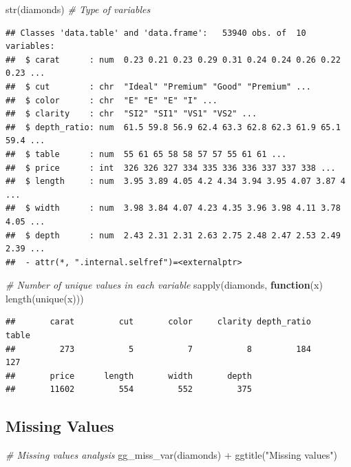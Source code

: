 \documentclass[
]{article}
\newenvironment{Shaded}{\begin{snugshade}}{\end{snugshade}}
\newcommand{\CommentTok}[1]{\textcolor[rgb]{0.56,0.35,0.01}{\textit{#1}}}
\newcommand{\ControlFlowTok}[1]{\textcolor[rgb]{0.13,0.29,0.53}{\textbf{#1}}}
\newcommand{\FunctionTok}[1]{\textcolor[rgb]{0.00,0.00,0.00}{#1}}
\newcommand{\NormalTok}[1]{#1}
\newcommand{\SpecialCharTok}[1]{\textcolor[rgb]{0.00,0.00,0.00}{#1}}
\newcommand{\StringTok}[1]{\textcolor[rgb]{0.31,0.60,0.02}{#1}}
\begin{document}
\begin{Shaded}
\begin{Highlighting}[]
\FunctionTok{str}\NormalTok{(diamonds) }\CommentTok{\# Type of variables}
\end{Highlighting}
\end{Shaded}

\begin{verbatim}
## Classes 'data.table' and 'data.frame':   53940 obs. of  10 variables:
##  $ carat      : num  0.23 0.21 0.23 0.29 0.31 0.24 0.24 0.26 0.22 0.23 ...
##  $ cut        : chr  "Ideal" "Premium" "Good" "Premium" ...
##  $ color      : chr  "E" "E" "E" "I" ...
##  $ clarity    : chr  "SI2" "SI1" "VS1" "VS2" ...
##  $ depth_ratio: num  61.5 59.8 56.9 62.4 63.3 62.8 62.3 61.9 65.1 59.4 ...
##  $ table      : num  55 61 65 58 58 57 57 55 61 61 ...
##  $ price      : int  326 326 327 334 335 336 336 337 337 338 ...
##  $ length     : num  3.95 3.89 4.05 4.2 4.34 3.94 3.95 4.07 3.87 4 ...
##  $ width      : num  3.98 3.84 4.07 4.23 4.35 3.96 3.98 4.11 3.78 4.05 ...
##  $ depth      : num  2.43 2.31 2.31 2.63 2.75 2.48 2.47 2.53 2.49 2.39 ...
##  - attr(*, ".internal.selfref")=<externalptr>
\end{verbatim}

\begin{Shaded}
\begin{Highlighting}[]
\CommentTok{\# Number of unique values in each variable}
\FunctionTok{sapply}\NormalTok{(diamonds, }\ControlFlowTok{function}\NormalTok{(x) }\FunctionTok{length}\NormalTok{(}\FunctionTok{unique}\NormalTok{(x)))}
\end{Highlighting}
\end{Shaded}

\begin{verbatim}
##       carat         cut       color     clarity depth_ratio       table 
##         273           5           7           8         184         127 
##       price      length       width       depth 
##       11602         554         552         375
\end{verbatim}

\hypertarget{missing-values}{%
\subsection{Missing Values}\label{missing-values}}

\begin{Shaded}
\begin{Highlighting}[]
\CommentTok{\# Missing values analysis}
\FunctionTok{gg\_miss\_var}\NormalTok{(diamonds) }\SpecialCharTok{+} \FunctionTok{ggtitle}\NormalTok{(}\StringTok{"Missing values"}\NormalTok{)}
\end{Highlighting}
\end{Shaded}
\end{document}
